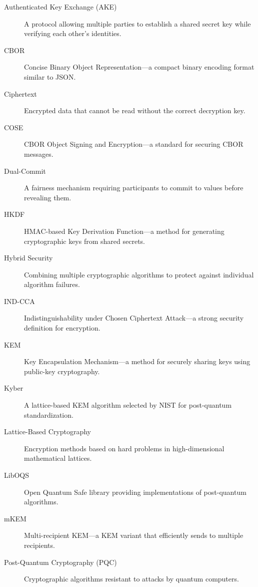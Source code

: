 \documentclass[12pt,a4paper]{report}
\begin{document}
\begin{description}

\item[Authenticated Key Exchange (AKE)] A protocol allowing multiple parties to establish a shared secret key while verifying each other's identities.

\item[CBOR] Concise Binary Object Representation—a compact binary encoding format similar to JSON.

\item[Ciphertext] Encrypted data that cannot be read without the correct decryption key.

\item[COSE] CBOR Object Signing and Encryption—a standard for securing CBOR messages.

\item[Dual-Commit] A fairness mechanism requiring participants to commit to values before revealing them.

\item[HKDF] HMAC-based Key Derivation Function—a method for generating cryptographic keys from shared secrets.

\item[Hybrid Security] Combining multiple cryptographic algorithms to protect against individual algorithm failures.

\item[IND-CCA] Indistinguishability under Chosen Ciphertext Attack—a strong security definition for encryption.

\item[KEM] Key Encapsulation Mechanism—a method for securely sharing keys using public-key cryptography.

\item[Kyber] A lattice-based KEM algorithm selected by NIST for post-quantum standardization.

\item[Lattice-Based Cryptography] Encryption methods based on hard problems in high-dimensional mathematical lattices.

\item[LibOQS] Open Quantum Safe library providing implementations of post-quantum algorithms.

\item[mKEM] Multi-recipient KEM—a KEM variant that efficiently sends to multiple recipients.

\item[Post-Quantum Cryptography (PQC)] Cryptographic algorithms resistant to attacks by quantum computers.


\end{description}
\end{document}
